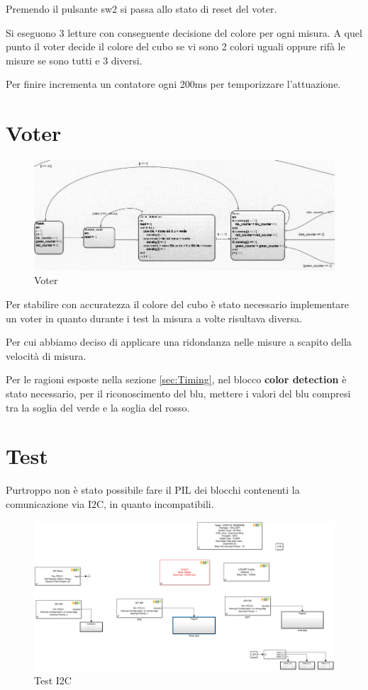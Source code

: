 \documentclass[12pt]{report}
\begin{document}
Premendo il pulsante sw2 si passa allo stato di reset del voter.

Si eseguono 3 letture con conseguente decisione del colore per ogni misura. A quel punto il voter decide il colore del cubo se vi sono 2 colori uguali oppure rifà le misure se sono tutti e 3 diversi.

Per finire incrementa un contatore ogni 200ms per temporizzare l'attuazione.

\section{Voter}

\begin{figure}
    \includegraphics[width=\textwidth]{Immagini_sensore/voter.png}
    \caption{Voter}
\end{figure}

Per stabilire con accuratezza il colore del cubo è stato necessario implementare un voter in quanto durante i test la misura a volte risultava diversa.

Per cui abbiamo deciso di applicare una ridondanza nelle misure a scapito della velocità di misura.

Per le ragioni esposte nella sezione \ref{sec:Timing}, nel blocco \textbf{color detection} è stato necessario, per il riconoscimento del blu, mettere i valori del blu compresi tra la soglia del verde e la soglia del rosso.

\section{Test}

Purtroppo non è stato possibile fare il PIL dei blocchi contenenti la comunicazione via I2C, in quanto incompatibili.

\begin{figure}
    \includegraphics[width=\textwidth]{Immagini_sensore/i2c_test.png}
    \caption{Test I2C}
\end{figure}
\end{document}
